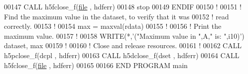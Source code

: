 \begin{DoxyCode}
00147      \textcolor{keyword}{CALL }h5fclose\_f(\hyperlink{structfile}{file} , hdferr)
00148      stop
00149 \textcolor{keywordflow}{  ENDIF}
00150   \textcolor{comment}{!}
00151   \textcolor{comment}{! Find the maximum value in the dataset, to verify that it was}
00152   \textcolor{comment}{! read correctly.}
00153   \textcolor{comment}{!}
00154   max = maxval(rdata)
00155   \textcolor{comment}{!}
00156   \textcolor{comment}{! Print the maximum value.}
00157   \textcolor{comment}{!}
00158   \textcolor{keyword}{WRITE}(*,\textcolor{stringliteral}{'("Maximum value in ",A," is: ",i10)'}) dataset, max
00159   \textcolor{comment}{!}
00160   \textcolor{comment}{! Close and release resources.}
00161   \textcolor{comment}{!}
00162   \textcolor{keyword}{CALL }h5pclose\_f(dcpl , hdferr)
00163   \textcolor{keyword}{CALL }h5dclose\_f(dset , hdferr)
00164   \textcolor{keyword}{CALL }h5fclose\_f(\hyperlink{structfile}{file} , hdferr)
00165 
00166 \textcolor{keyword}{END PROGRAM }main
\end{DoxyCode}
